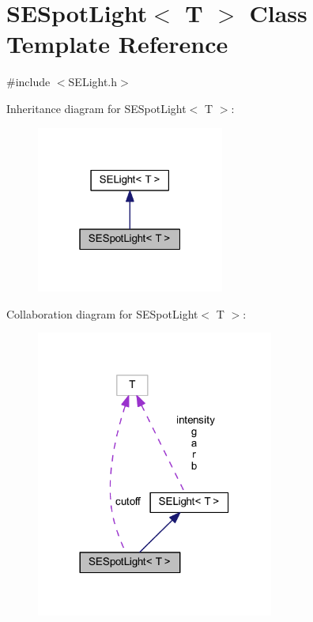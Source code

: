 \section{S\+E\+Spot\+Light$<$ T $>$ Class Template Reference}
\label{class_s_e_spot_light}


{\ttfamily \#include $<$S\+E\+Light.\+h$>$}



Inheritance diagram for S\+E\+Spot\+Light$<$ T $>$\+:
\nopagebreak
\begin{figure}[H]
\begin{center}
\leavevmode
\includegraphics[width=175pt]{class_s_e_spot_light__inherit__graph}
\end{center}
\end{figure}


Collaboration diagram for S\+E\+Spot\+Light$<$ T $>$\+:
\nopagebreak
\begin{figure}[H]
\begin{center}
\leavevmode
\includegraphics[width=221pt]{class_s_e_spot_light__coll__graph}
\end{center}
\end{figure}
